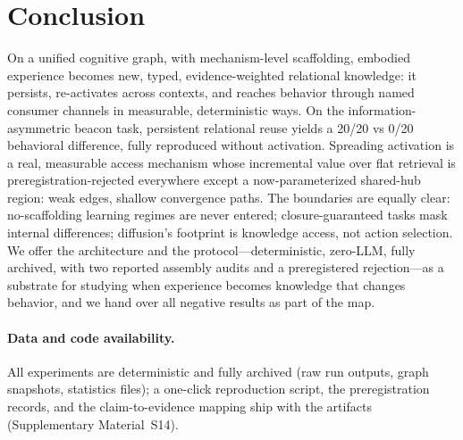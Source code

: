 \documentclass[10pt,a4paper]{article}
\begin{document}
\section{Conclusion}
On a unified cognitive graph, with mechanism-level scaffolding, embodied experience becomes new, typed, evidence-weighted relational knowledge: it persists, re-activates across contexts, and reaches behavior through named consumer channels in measurable, deterministic ways. On the information-asymmetric beacon task, persistent relational reuse yields a 20/20 vs 0/20 behavioral difference, fully reproduced without activation. Spreading activation is a real, measurable access mechanism whose incremental value over flat retrieval is preregistration-rejected everywhere except a now-parameterized shared-hub region: weak edges, shallow convergence paths. The boundaries are equally clear: no-scaffolding learning regimes are never entered; closure-guaranteed tasks mask internal differences; diffusion's footprint is knowledge access, not action selection. We offer the architecture and the protocol---deterministic, zero-LLM, fully archived, with two reported assembly audits and a preregistered rejection---as a substrate for studying when experience becomes knowledge that changes behavior, and we hand over all negative results as part of the map.

\paragraph{Data and code availability.} All experiments are deterministic and fully archived (raw run outputs, graph snapshots, statistics files); a one-click reproduction script, the preregistration records, and the claim-to-evidence mapping ship with the artifacts (Supplementary Material~S14).



\end{document}
